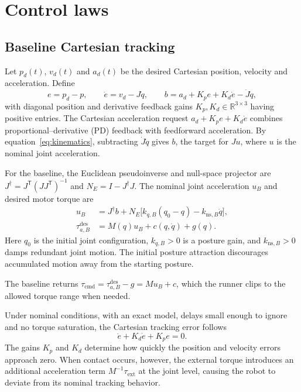 \documentclass[11pt,a4paper]{article}
\begin{document}
\section{Control laws}
\subsection{Baseline Cartesian tracking}
Let $p_d(t)$, $v_d(t)$ and $a_d(t)$ be the desired Cartesian position, velocity
and acceleration. Define
\begin{equation}
 e=p_d-p,\qquad \dot e=v_d-J\dot q,\qquad
 b=a_d+K_p e+K_d\dot e-\dot J\dot q ,
 \label{eq:tracking-target}
\end{equation}
with diagonal position and derivative feedback gains
$K_p,K_d\in\mathbb R^{3\times3}$ having positive entries.
The Cartesian acceleration request $a_d+K_p e+K_d\dot e$ combines
proportional--derivative (PD) feedback with feedforward acceleration.
By equation~\eqref{eq:kinematics}, subtracting $\dot J\dot q$ gives $b$,
the target for $Ju$, where $u$ is the nominal joint acceleration.

For the baseline, the Euclidean pseudoinverse and null-space projector are
$J^\dagger=J^{\mathsf T}(JJ^{\mathsf T})^{-1}$ and $N_E=I-J^\dagger J$.
The nominal joint acceleration $u_B$ and desired motor torque are
\begin{equation}
 \boxed{\begin{aligned}
 u_B&=J^\dagger b+
        N_E\bigl[k_{q,B}(q_0-q)-k_{\mathrm{ns},B}\dot q\bigr],\\
 \tau_{a,B}^{\mathrm{des}}&=M(q)u_B+c(q,\dot q)+g(q).
 \end{aligned}}
 \label{eq:baseline}
\end{equation}
Here $q_0$ is the initial joint configuration, $k_{q,B}>0$ is a posture gain,
and $k_{\mathrm{ns},B}>0$ damps redundant joint motion. The initial posture attraction discourages accumulated motion away from the starting posture.

The baseline returns $\tau_{\mathrm{cmd}}=\tau_{a,B}^{\mathrm{des}}-g=Mu_B+c$,
which the runner clips to the allowed torque range when needed.

Under nominal conditions, with an exact model, delays small enough to
ignore and no torque saturation, the Cartesian tracking error follows
\begin{equation}
 \ddot e+K_d\dot e+K_p e=0.
 \label{eq:nominal-error}
\end{equation}
The gains $K_p$ and $K_d$ determine how quickly the position and velocity
errors approach zero. When contact occurs,
however, the external torque introduces an additional acceleration
term $M^{-1}\tau_{\mathrm{ext}}$ at the joint level, causing the robot
to deviate from its nominal tracking behavior.
\end{document}
